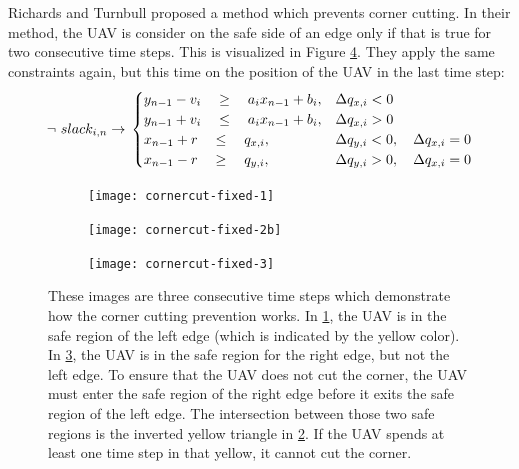 Richards and Turnbull\cite{Richards2015} proposed a method which prevents corner cutting. In their method, the UAV is consider on the safe side of an edge only if that is true for two consecutive time steps.  This is visualized in Figure \ref{fig:cc-fixed}. They apply the same constraints again, but this time on the position of the UAV in the last time step:
\begin{equation}
\label{eq:corner-skip-fixed}
\neg ~ slack_{i,n} \rightarrow \\
\begin{cases}
y_{n-1} -  v_i \quad \geq 
\quad a_{i} x_{n-1} + b_{i},  	
& \Delta q_{x,i} < 0 							 	
 \\
y_{n-1} + v_i \quad \leq 
\quad a_{i} x_{n-1} + b_{i},
& \Delta q_{x,i} > 0 							 	
 \\
x_{n-1} + r \quad \leq
\quad  q_{x,i}, 		
& \Delta q_{y,i} < 0, \quad \Delta q_{x,i} = 0 	
 \\
x_{n-1} - r \quad \geq 
\quad q_{y,i},  		
& \Delta q_{y,i} > 0, \quad \Delta q_{x,i} = 0 	
\end{cases}
\end{equation}
\begin{figure}
	\centering
	\begin{subfigure}[t]{0.3\columnwidth}
        		\texttt{[image: cornercut-fixed-1]}
        		\caption{}
        		\label{fig:cc-fixed-1}
	\end{subfigure}
	\hfil
	\begin{subfigure}[t]{0.3\columnwidth}
        		\texttt{[image: cornercut-fixed-2b]}
        		\caption{}
        		 \label{fig:cc-fixed-2}
	\end{subfigure}	
		\hfil
	\begin{subfigure}[t]{0.3\columnwidth}
        		\texttt{[image: cornercut-fixed-3]}
        		\caption{}
        		\label{fig:cc-fixed-3}
	\end{subfigure}
    \caption[A visual demonstration of how the corner cutting prevention works.]{These images are three consecutive time steps which demonstrate how the corner cutting prevention works. In \ref{fig:cc-fixed-1}, the UAV is in the safe region of the left edge (which is indicated by the yellow color). In \ref{fig:cc-fixed-3}, the UAV is in the safe region for the right edge, but not the left edge. To ensure that the UAV does not cut the corner, the UAV must enter the safe region of the right edge before it exits the safe region of the left edge. The intersection between those two safe regions is the inverted yellow triangle in \ref{fig:cc-fixed-2}. If the UAV spends at least one time step in that yellow, it cannot cut the corner.}
    \label{fig:cc-fixed}     
\end{figure}

